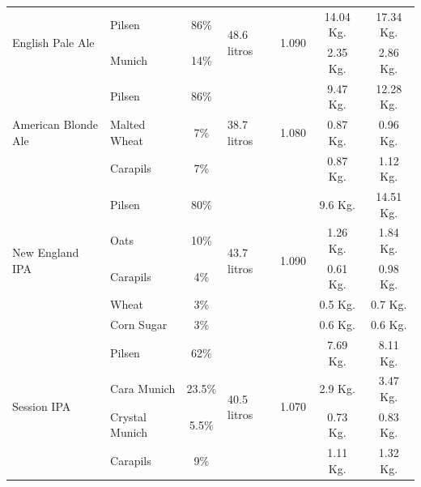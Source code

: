 \begin{longtable}{|p{1.8cm}|p{1.8cm}|p{1.8cm}|p{1.9cm}|p{1.7cm}|p{2cm}|p{2cm}|}
    \multirow{2}{2cm}{English Pale Ale} & Pilsen &\multicolumn{1}{c|}{86\%}  &\multirow{2}{2cm}{48.6 litros}  &\multirow{2}{2cm}{1.090} & \multicolumn{1}{c|}{14.04 Kg.} & \multicolumn{1}{c|}{17.34 Kg.}\\
         & Munich & \multicolumn{1}{c|}{14\%} & & &\multicolumn{1}{c|}{2.35 Kg.} &\multicolumn{1}{c|}{2.86 Kg.} \\
        \hline
        \multirow{3}{2cm}{American Blonde Ale} & Pilsen &\multicolumn{1}{c|}{86\%}  &\multirow{3}{2cm}{38.7 litros}  &\multirow{3}{2cm}{1.080} & \multicolumn{1}{c|}{9.47 Kg.} & \multicolumn{1}{c|}{12.28 Kg.}\\
         & Malted Wheat & \multicolumn{1}{c|}{7\%} & & &\multicolumn{1}{c|}{0.87 Kg.} &\multicolumn{1}{c|}{0.96 Kg.}\\ 
         & Carapils & \multicolumn{1}{c|}{7\%} & & & \multicolumn{1}{c|}{0.87 Kg.} &\multicolumn{1}{c|}{1.12 Kg.} \\
        \hline
        \multirow{5}{2cm}{New England IPA} & Pilsen &\multicolumn{1}{c|}{80\%}  &\multirow{5}{2cm}{43.7 litros}  &\multirow{5}{2cm}{1.090} & \multicolumn{1}{c|}{9.6 Kg.} & \multicolumn{1}{c|}{14.51 Kg.}\\
         & Oats & \multicolumn{1}{c|}{10\%} & & &\multicolumn{1}{c|}{1.26 Kg.} &\multicolumn{1}{c|}{1.84 Kg.} \\
        & Carapils & \multicolumn{1}{c|}{4\%} & & &\multicolumn{1}{c|}{0.61 Kg.} &\multicolumn{1}{c|}{0.98 Kg.} \\
        & Wheat & \multicolumn{1}{c|}{3\%} & & &\multicolumn{1}{c|}{0.5 Kg.} &\multicolumn{1}{c|}{0.7 Kg.} \\
        & Corn Sugar & \multicolumn{1}{c|}{3\%} & & &\multicolumn{1}{c|}{0.6 Kg.} &\multicolumn{1}{c|}{0.6 Kg.} \\
        \hline
        \multirow{4}{2cm}{Session IPA} & Pilsen &\multicolumn{1}{c|}{62\%}  &\multirow{4}{2cm}{40.5 litros}  &\multirow{4}{2cm}{1.070} & \multicolumn{1}{c|}{7.69 Kg.} & \multicolumn{1}{c|}{8.11 Kg.}\\
         & Cara Munich & \multicolumn{1}{c|}{23.5\%} & & &\multicolumn{1}{c|}{2.9 Kg.} &\multicolumn{1}{c|}{3.47 Kg.} \\
        & Crystal Munich & \multicolumn{1}{c|}{5.5\%} & & &\multicolumn{1}{c|}{0.73 Kg.} &\multicolumn{1}{c|}{0.83 Kg.} \\
        & Carapils & \multicolumn{1}{c|}{9\%} & & &\multicolumn{1}{c|}{1.11 Kg.} &\multicolumn{1}{c|}{1.32 Kg.} \\

\end{longtable}
